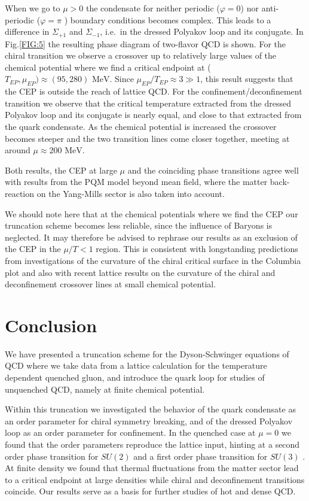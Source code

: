 \documentclass[a4paper,fleqn]{cls/cas-dc}
\begin{document}
When we go to $\mu > 0$ the condensate for neither periodic ($\varphi = 0$) nor anti-periodic ($\varphi = \pi$ ) boundary conditions
becomes complex. This leads to a difference in $\Sigma_{+1}$ and $\Sigma_{- 1}$, i.e.\ in the dressed Polyakov loop and its conjugate. In Fig.\ref{FIG:5} the
resulting phase diagram of two-flavor QCD is shown. For the chiral transition we observe a crossover up to relatively large
values of the chemical potential where we find a critical endpoint at ($T_{ EP}, \mu_{EP}) \approx ( 95 , 280 ) \text{ MeV}$. Since $\mu_{EP} / T_{EP} \approx 3 \gg 1$,
this result suggests that the CEP is outside the reach of lattice QCD. For the confinement/deconfinement transition we
observe that the critical temperature extracted from the dressed Polyakov loop and its conjugate is nearly equal, and close
to that extracted from the quark condensate. As the chemical potential is increased the crossover becomes steeper and the
two transition lines come closer together, meeting at around $\mu \approx 200 \text{ MeV}$.

Both results, the CEP at large $\mu$ and the coinciding phase transitions agree well with results from the PQM model \cite{PhysRevC.83.054904}
beyond mean field, where the matter back-reaction on the Yang-Mills sector is also taken into account.

We should note here that at the chemical potentials where we find the CEP our truncation scheme becomes less reliable,
since the influence of Baryons is neglected. It may therefore be advised to rephrase our results as an exclusion of the CEP
in the $\mu/ T < 1$ region. This is consistent with longstanding predictions from investigations of the curvature of the chiral
critical surface in the Columbia plot \cite{DEFORCRAND2002290} and also with recent lattice results on the curvature of the chiral and deconfinement
crossover lines at small chemical potential.

\section{Conclusion}
We have presented a truncation scheme for the Dyson-Schwinger equations of QCD where we take data from a lattice
calculation for the temperature dependent quenched gluon, and introduce the quark loop for studies of unquenched QCD,
namely at finite chemical potential.

Within this truncation we investigated the behavior of the quark condensate as an order parameter for chiral symmetry
breaking, and of the dressed Polyakov loop as an order parameter for confinement. In the quenched case at $\mu = 0$ we
found that the order parameters reproduce the lattice input, hinting at a second order phase transition for $SU ( 2 )$ and a
first order phase transition for $SU ( 3 )$ . At finite density we found that thermal fluctuations from the matter sector lead to
a critical endpoint at large densities while chiral and deconfinement transitions coincide. Our results serve as a basis for
further studies of hot and dense QCD.
\end{document}
